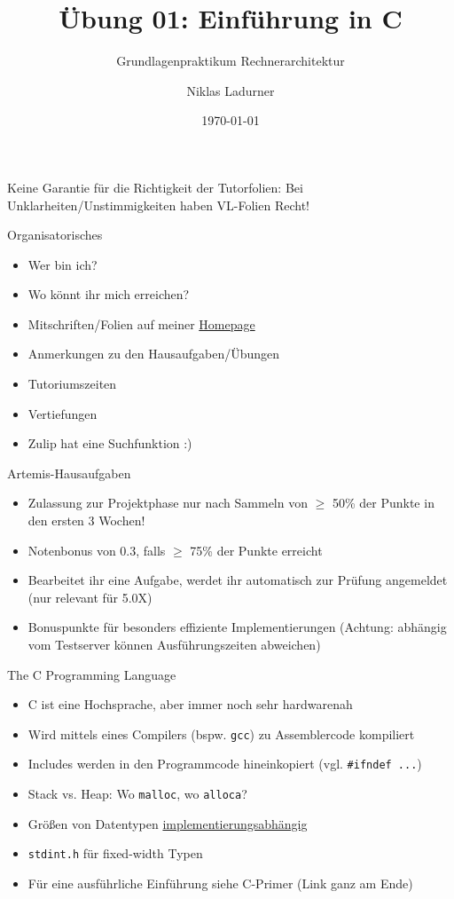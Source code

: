 \documentclass[
  german,            %
  aspectratio=169,    %
]{tumbeamer}
\title{Übung 01: Einführung in C}
\subtitle{Grundlagenpraktikum Rechnerarchitektur}
\author{Niklas Ladurner}
\institute{\theChairName\\\theDepartmentName\\\theUniversityName}
\date[\today]{\today}
\begin{document}
\maketitle

\begin{frame}[c]{}{}
  \begin{center}
    \LARGE  Keine Garantie für die Richtigkeit der Tutorfolien: Bei Unklarheiten/Unstimmigkeiten 
    haben VL-Folien Recht!
  \end{center}
\end{frame}

\begin{frame}[c]{Organisatorisches}{}
  \begin{itemize}
    \item Wer bin ich?
    \item Wo könnt ihr mich erreichen?
    \item Mitschriften/Folien auf meiner \href{https://home.in.tum.de/~ladu/}{Homepage} 
    \item Anmerkungen zu den Hausaufgaben/Übungen
    \item Tutoriumszeiten
    \item Vertiefungen
    \item Zulip hat eine Suchfunktion :)
  \end{itemize}
\end{frame}

\begin{frame}[c]{Artemis-Hausaufgaben}{}
  \begin{itemize}
    \item Zulassung zur Projektphase nur nach Sammeln von $\ge$ 50\%
    der Punkte in den ersten 3 Wochen!
    \item Notenbonus von 0.3, falls $\ge$ 75\% der Punkte erreicht
    \item Bearbeitet ihr eine Aufgabe, werdet ihr automatisch zur Prüfung
    angemeldet (nur relevant für 5.0X)
    \item Bonuspunkte für besonders effiziente Implementierungen (Achtung: abhängig
    vom Testserver können Ausführungszeiten abweichen)
  \end{itemize}
\end{frame}

\begin{frame}[c, fragile]{The C Programming Language}{}
  \begin{itemize}
  \item C ist eine Hochsprache, aber immer noch sehr hardwarenah
  \item Wird mittels eines Compilers (bspw. \verb|gcc|) zu Assemblercode kompiliert
  \item Includes werden in den Programmcode hineinkopiert (vgl. \verb|#ifndef ...|)
  \item Stack vs. Heap: Wo \verb|malloc|, wo \verb|alloca|?
  \item Größen von Datentypen \underline{implementierungsabhängig}
  \item \verb|stdint.h| für fixed-width Typen
  \item Für eine ausführliche Einführung siehe C-Primer (Link ganz am Ende)
  \end{itemize}
\end{frame}
\end{document}
